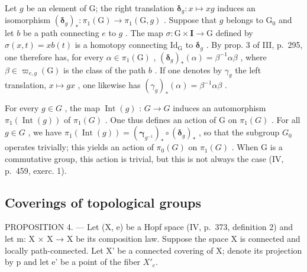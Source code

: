 Let \(g\) be an element of G; the right translation \(\boldsymbol{\delta}_g \colon x \mapsto xg\) induces an isomorphism \((\boldsymbol{\delta}_g)_* \colon \pi_1(\mathrm{G}) \to \pi_1(\mathrm{G}, g)\) . Suppose that \(g\) belongs to \(\mathrm{G}_0\) and let \(b\) be a path connecting \(e\) to \(g\) . The map \(\sigma \colon \mathrm{G} \times \mathbf{I} \to \mathrm{G}\) defined by \(\sigma(x, t) = xb(t)\) is a homotopy connecting \(\mathrm{Id}_{\mathrm{G}}\) to \(\boldsymbol{\delta}_g\) . By prop. 3 of III, p.~295, one therefore has, for every \(\alpha \in \pi_1(\mathrm{G})\) , \((\boldsymbol{\delta}_g)_*(\alpha) = \beta^{-1}\alpha\beta\) , where \(\beta \in \varpi_{e,g}(\mathrm{G})\) is the class of the path \(b\) . If one denotes by \(\gamma_g\) the left translation, \(x \mapsto gx\) , one likewise has \((\gamma_g)_*(\alpha) = \beta^{-1}\alpha\beta\) .

For every \(g \in G\) , the map \(\operatorname{Int}(g)\) : \(G \to G\) induces an automorphism \(\pi_{1}(\operatorname{Int}(g))\) of \(\pi_{1}(G)\) . One thus defines an action of G on \(\pi_{1}(G)\) . For all \(g \in G\) , we have \(\pi_{1}(\operatorname{Int}(g)) = (\boldsymbol{\gamma}_{g^{-1}})_{*} \circ (\boldsymbol{\delta}_{g})_{*}\) , so that the subgroup \(G_{0}\) operates trivially; this yields an action of \(\pi_{0}(G)\) on \(\pi_{1}(G)\) . When G is a commutative group, this action is trivial, but this is not always the case (IV, p.~459, exerc. 1).

\subsection{Coverings of topological groups}

PROPOSITION 4. --- Let (X, e) be a Hopf space (IV, p.~373, definition 2) and let m: X × X → X be its composition law. Suppose the space X is connected and locally path-connected. Let X' be a connected covering of X; denote its projection by p and let e' be a point of the fiber \(X'_{e}\).

